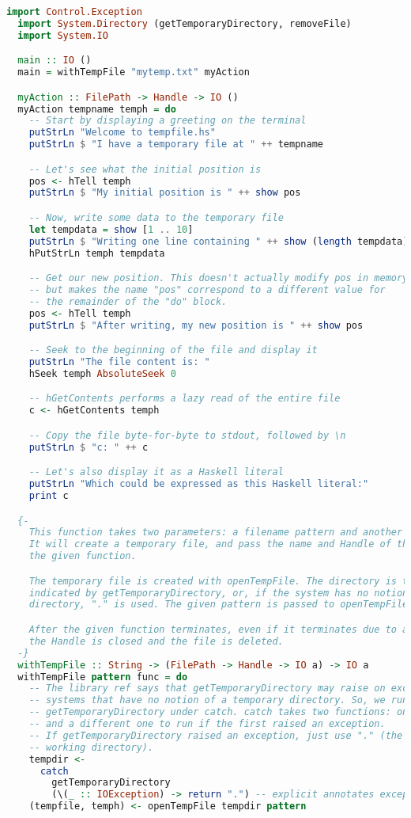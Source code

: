 \documentclass[./main.tex]{subfiles}
\begin{document}
\begin{lstlisting}[language=Haskell]
  import Control.Exception
  import System.Directory (getTemporaryDirectory, removeFile)
  import System.IO

  main :: IO ()
  main = withTempFile "mytemp.txt" myAction

  myAction :: FilePath -> Handle -> IO ()
  myAction tempname temph = do
    -- Start by displaying a greeting on the terminal
    putStrLn "Welcome to tempfile.hs"
    putStrLn $ "I have a temporary file at " ++ tempname

    -- Let's see what the initial position is
    pos <- hTell temph
    putStrLn $ "My initial position is " ++ show pos

    -- Now, write some data to the temporary file
    let tempdata = show [1 .. 10]
    putStrLn $ "Writing one line containing " ++ show (length tempdata) ++ " bytes: " ++ tempdata
    hPutStrLn temph tempdata

    -- Get our new position. This doesn't actually modify pos in memory,
    -- but makes the name "pos" correspond to a different value for
    -- the remainder of the "do" block.
    pos <- hTell temph
    putStrLn $ "After writing, my new position is " ++ show pos

    -- Seek to the beginning of the file and display it
    putStrLn "The file content is: "
    hSeek temph AbsoluteSeek 0

    -- hGetContents performs a lazy read of the entire file
    c <- hGetContents temph

    -- Copy the file byte-for-byte to stdout, followed by \n
    putStrLn $ "c: " ++ c

    -- Let's also display it as a Haskell literal
    putStrLn "Which could be expressed as this Haskell literal:"
    print c

  {-
    This function takes two parameters: a filename pattern and another function.
    It will create a temporary file, and pass the name and Handle of that file to
    the given function.

    The temporary file is created with openTempFile. The directory is the one
    indicated by getTemporaryDirectory, or, if the system has no notion of a temporary
    directory, "." is used. The given pattern is passed to openTempFile.

    After the given function terminates, even if it terminates due to an exception,
    the Handle is closed and the file is deleted.
  -}
  withTempFile :: String -> (FilePath -> Handle -> IO a) -> IO a
  withTempFile pattern func = do
    -- The library ref says that getTemporaryDirectory may raise on exception on
    -- systems that have no notion of a temporary directory. So, we run
    -- getTemporaryDirectory under catch. catch takes two functions: one to run,
    -- and a different one to run if the first raised an exception.
    -- If getTemporaryDirectory raised an exception, just use "." (the current
    -- working directory).
    tempdir <-
      catch
        getTemporaryDirectory
        (\(_ :: IOException) -> return ".") -- explicit annotates exception type
    (tempfile, temph) <- openTempFile tempdir pattern


\end{lstlisting}
\end{document}
